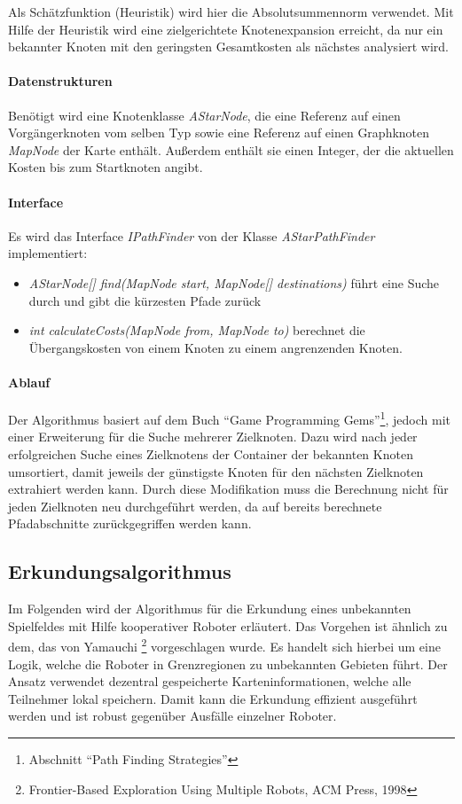 \documentclass[10pt,a4paper]{article}
\begin{document}
			Als Schätzfunktion (Heuristik) wird hier die Absolutsummennorm verwendet. Mit Hilfe der Heuristik wird eine 
			zielgerichtete Knotenexpansion erreicht, da nur ein bekannter Knoten mit den 
			geringsten Gesamtkosten als nächstes analysiert wird.
		\paragraph{Datenstrukturen}
			Benötigt wird eine Knotenklasse \textit{AStarNode}, die eine Referenz auf einen Vorgängerknoten vom selben
			Typ sowie eine Referenz auf	einen Graphknoten \textit{MapNode} der Karte enthält. Außerdem enthält sie
			einen Integer, der die aktuellen Kosten bis zum Startknoten angibt.
		\paragraph{Interface}
			Es wird das Interface \textit{IPathFinder} von der Klasse \textit{AStarPathFinder} implementiert:
			\begin{itemize}
				\item \textit{AStarNode[] find(MapNode start, MapNode[] destinations)} führt eine Suche durch und
				gibt die kürzesten Pfade zurück
				\item \textit{int calculateCosts(MapNode from, MapNode to)} berechnet die Übergangskosten von einem
				Knoten zu einem angrenzenden Knoten.
			\end{itemize}
		\paragraph{Ablauf}
			Der Algorithmus basiert auf dem Buch ``Game Programming Gems''\footnote{Abschnitt ``Path Finding Strategies''},
			jedoch mit einer Erweiterung für die Suche mehrerer Zielknoten. Dazu wird nach jeder erfolgreichen Suche
			eines Zielknotens der Container der bekannten Knoten umsortiert, damit jeweils der günstigste Knoten für den
			nächsten Zielknoten extrahiert werden kann. Durch diese Modifikation muss die Berechnung nicht für jeden
			Zielknoten neu durchgeführt werden, da auf bereits berechnete Pfadabschnitte zurückgegriffen werden kann.

		\subsection{Erkundungsalgorithmus}
			Im Folgenden wird der Algorithmus für die Erkundung eines unbekannten Spielfeldes mit Hilfe kooperativer Roboter erläutert. Das
			Vorgehen ist ähnlich zu dem, das von Yamauchi	\footnote{Frontier-Based Exploration Using Multiple Robots, ACM Press, 1998}
			vorgeschlagen wurde. Es handelt sich hierbei um eine Logik, welche die Roboter in Grenzregionen zu unbekannten Gebieten führt.
			Der Ansatz verwendet dezentral gespeicherte Karteninformationen, welche alle Teilnehmer lokal speichern. Damit
			kann die Erkundung effizient ausgeführt werden und ist robust gegenüber Ausfälle einzelner Roboter.
\end{document}
